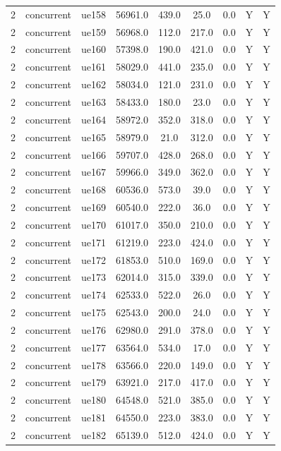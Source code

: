 \begin{table}[ht]
\begin{tabular}{|c|c|c|c|c|c|c|c|c|}
2 & concurrent & ue158 & 56961.0 & 439.0 & 25.0 & 0.0 & Y & Y \\
2 & concurrent & ue159 & 56968.0 & 112.0 & 217.0 & 0.0 & Y & Y \\
2 & concurrent & ue160 & 57398.0 & 190.0 & 421.0 & 0.0 & Y & Y \\
2 & concurrent & ue161 & 58029.0 & 441.0 & 235.0 & 0.0 & Y & Y \\
2 & concurrent & ue162 & 58034.0 & 121.0 & 231.0 & 0.0 & Y & Y \\
2 & concurrent & ue163 & 58433.0 & 180.0 & 23.0 & 0.0 & Y & Y \\
2 & concurrent & ue164 & 58972.0 & 352.0 & 318.0 & 0.0 & Y & Y \\
2 & concurrent & ue165 & 58979.0 & 21.0 & 312.0 & 0.0 & Y & Y \\
2 & concurrent & ue166 & 59707.0 & 428.0 & 268.0 & 0.0 & Y & Y \\
2 & concurrent & ue167 & 59966.0 & 349.0 & 362.0 & 0.0 & Y & Y \\
2 & concurrent & ue168 & 60536.0 & 573.0 & 39.0 & 0.0 & Y & Y \\
2 & concurrent & ue169 & 60540.0 & 222.0 & 36.0 & 0.0 & Y & Y \\
2 & concurrent & ue170 & 61017.0 & 350.0 & 210.0 & 0.0 & Y & Y \\
2 & concurrent & ue171 & 61219.0 & 223.0 & 424.0 & 0.0 & Y & Y \\
2 & concurrent & ue172 & 61853.0 & 510.0 & 169.0 & 0.0 & Y & Y \\
2 & concurrent & ue173 & 62014.0 & 315.0 & 339.0 & 0.0 & Y & Y \\
2 & concurrent & ue174 & 62533.0 & 522.0 & 26.0 & 0.0 & Y & Y \\
2 & concurrent & ue175 & 62543.0 & 200.0 & 24.0 & 0.0 & Y & Y \\
2 & concurrent & ue176 & 62980.0 & 291.0 & 378.0 & 0.0 & Y & Y \\
2 & concurrent & ue177 & 63564.0 & 534.0 & 17.0 & 0.0 & Y & Y \\
2 & concurrent & ue178 & 63566.0 & 220.0 & 149.0 & 0.0 & Y & Y \\
2 & concurrent & ue179 & 63921.0 & 217.0 & 417.0 & 0.0 & Y & Y \\
2 & concurrent & ue180 & 64548.0 & 521.0 & 385.0 & 0.0 & Y & Y \\
2 & concurrent & ue181 & 64550.0 & 223.0 & 383.0 & 0.0 & Y & Y \\
2 & concurrent & ue182 & 65139.0 & 512.0 & 424.0 & 0.0 & Y & Y \\

\end{tabular}
\end{table}
